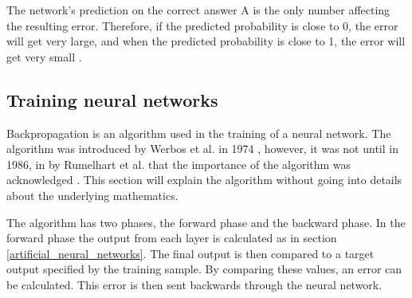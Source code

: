 The network's prediction on the correct answer A is the only number affecting the resulting error. Therefore, if the predicted probability is close to 0, the error will get very large, and when the predicted probability is close to 1, the error will get very small \cite{brownlee_how_2017}.

\subsection{Training neural networks}
\label{training_with_backpropagation}

Backpropagation is an algorithm used in the training of a neural network. The algorithm was introduced by Werbos et al. in 1974 \cite{werbos_beyond_1974}, however, it was not until in 1986, in \cite{rumelhart_learning_1986} by Rumelhart et al. that the importance of the algorithm was acknowledged \cite{_backpropagation_????-1}. This section will explain the algorithm without going into details about the underlying mathematics. 

The algorithm has two phases, the forward phase and the backward phase. In the forward phase the output from each layer is calculated as in section \ref{artificial_neural_networks}. The final output is then compared to a target output specified by the training sample. By comparing these values, an error can be calculated. This error is then sent backwards through the neural network.

